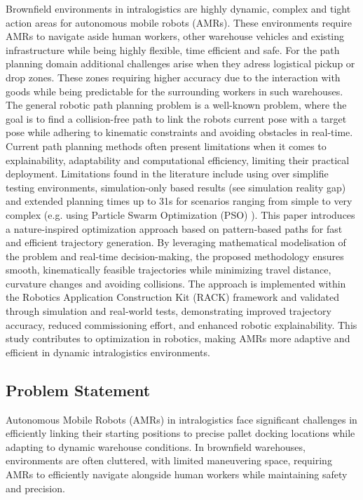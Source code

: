 \documentclass{amam}                %
\begin{document}
Brownfield environments in intralogistics are highly dynamic, complex and tight action areas for autonomous mobile robots (AMRs).
These environments require AMRs to navigate aside human workers, other warehouse vehicles and existing infrastructure while being highly 
flexible, time efficient and safe. For the path planning domain additional challenges arise when 
they adress logistical pickup or drop zones. These zones requiring higher accuracy due to the interaction with goods  while being
predictable for the surrounding workers in such warehouses. The general robotic path planning problem is a well-known problem,
where the goal is to find a collision-free path to link the robots current pose with a target pose while adhering to kinematic
constraints and avoiding obstacles in real-time. Current path planning methods often present limitations when it comes to explainability,
adaptability and computational efficiency, limiting their practical deployment. Limitations found in the literature include using over simplifie
 testing environments, simulation-only based results (see simulation reality gap) and extended planning times up to 31s for scenarios ranging from simple to 
very complex (e.g. using Particle Swarm Optimization (PSO) \cite{ref1}). This paper introduces a nature-inspired optimization approach based on
pattern-based paths for fast and efficient trajectory generation. By leveraging mathematical modelisation of the problem and real-time 
decision-making, the proposed  methodology ensures smooth, kinematically feasible trajectories while minimizing travel distance, curvature changes
and avoiding collisions. The approach is implemented within the Robotics Application Construction Kit (RACK) framework and validated through simulation and real-world tests,
demonstrating improved trajectory accuracy, reduced commissioning effort, and enhanced robotic explainability. This study contributes to optimization
in robotics, making AMRs more adaptive and efficient in dynamic intralogistics environments.

\subsection{Problem Statement}
Autonomous Mobile Robots (AMRs) in intralogistics face significant challenges in efficiently linking their starting positions to precise pallet docking locations while adapting to dynamic warehouse conditions. In brownfield warehouses, environments are often cluttered, with limited maneuvering space, requiring AMRs to efficiently navigate alongside human workers while maintaining safety and precision.
\end{document}
